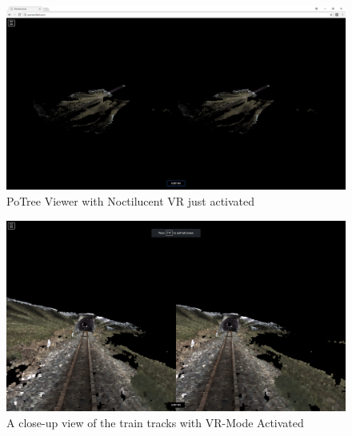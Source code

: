 \documentclass[draftclsnofoot,onecolumn]{IEEEtran}
\begin{document}
\begin{figure}[h]
	\centering
	\includegraphics{NoctVR3}
	\caption{PoTree Viewer with Noctilucent VR just activated}
\end{figure}

\begin{figure}[h]
	\centering
	\includegraphics{NoctVR4}
	\caption{A close-up view of the train tracks with VR-Mode Activated}
\end{figure}
\end{document}
